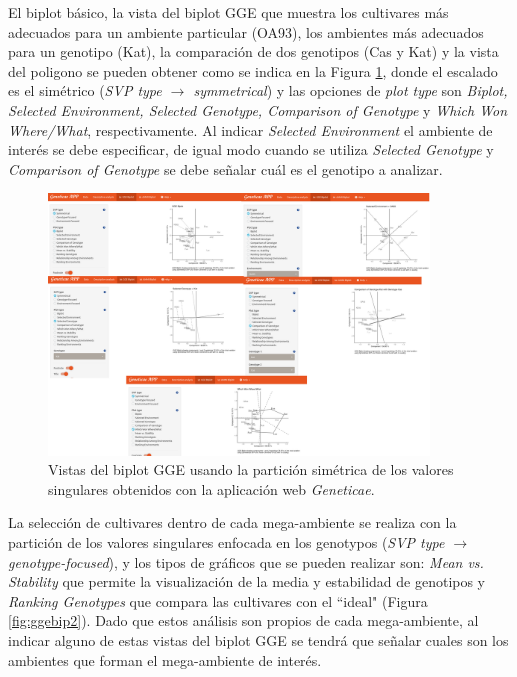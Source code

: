 El biplot básico, la vista del biplot GGE que muestra los cultivares más adecuados para un ambiente particular (OA93), los ambientes más adecuados para un genotipo (Kat), la comparación de dos genotipos (Cas y Kat) y la vista del poligono se pueden obtener como se indica en la Figura \ref{fig:ggebip1}, donde el escalado es el simétrico (\emph{SVP type $\rightarrow$ symmetrical}) y las opciones de \emph{plot type} son \emph{Biplot,
Selected Environment, Selected Genotype, Comparison of Genotype} y \emph{Which Won Where/What}, respectivamente. Al indicar \emph{Selected Environment} el ambiente de interés se debe especificar, de igual modo cuando se utiliza \emph{Selected Genotype} y 
\emph{Comparison of Genotype} se debe señalar cuál es el genotipo a analizar.

\begin{figure}[H]
	\begin{center}
		\includegraphics[width=0.9\textwidth]{./Graficos/www/GGE_biplotAPP1.png}
	\end{center}
	\caption{Vistas del biplot GGE usando la partición simétrica de los valores singulares obtenidos con la aplicación web \emph{Geneticae}.}
	\label{fig:ggebip1}
\end{figure}

La selección de cultivares dentro de cada mega-ambiente se realiza con la partición de los valores singulares enfocada en los genotypos (\emph{SVP type $\rightarrow$ genotype-focused}), y los tipos de gráficos que se pueden realizar son: \emph{Mean vs. Stability} que permite la visualización de la media y estabilidad de genotipos y \emph{Ranking Genotypes} que compara las cultivares con el ``ideal" (Figura \ref{fig:ggebip2}). Dado que estos análisis son propios de cada mega-ambiente, al indicar alguno de estas vistas del biplot GGE se tendrá que señalar cuales son los ambientes que forman el mega-ambiente de interés. 


